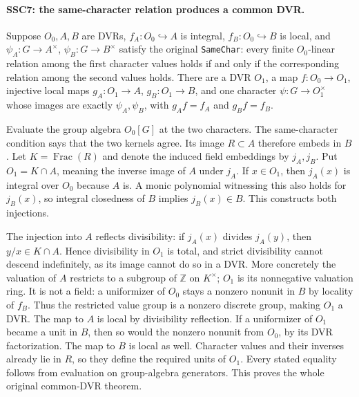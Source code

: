\documentclass[11pt,a4paper]{article}
\numberwithin{equation}{section}
\theoremstyle{remark}\newtheorem{remark}[theorem]{Remark}
\begin{document}
\paragraph{SSC7: the same-character relation produces a common DVR.}
\label{claim:SSC7}
Suppose $O_0,A,B$ are DVRs, $f_A:O_0\hookrightarrow A$ is
integral, $f_B:O_0\hookrightarrow B$ is local, and
$\psi_A:G\to A^\times$, $\psi_B:G\to B^\times$ satisfy the
original \texttt{Same\allowbreak Char}: every finite $O_0$-linear relation
among the first character values holds if and only if the
corresponding relation among the second values holds. There are a
DVR $O_1$, a map $f:O_0\to O_1$, injective local maps
$g_A:O_1\to A$, $g_B:O_1\to B$, and one character
$\psi:G\to O_1^\times$ whose images are exactly $\psi_A,\psi_B$,
with $g_Af=f_A$ and $g_Bf=f_B$.

Evaluate the group algebra $O_0[G]$ at the two characters. The
same-character condition says that the two kernels agree. Its
image $R\subset A$ therefore embeds in $B$. Let
$K=\operatorname{Frac}(R)$ and denote the induced field embeddings
by $j_A,j_B$. Put $O_1=K\cap A$, meaning the inverse image of $A$
under $j_A$. If $x\in O_1$, then $j_A(x)$ is integral over $O_0$
because $A$ is. A monic polynomial witnessing this also holds
for $j_B(x)$, so integral closedness of $B$ implies $j_B(x)\in B$.
This constructs both injections.

The injection into $A$ reflects divisibility: if $j_A(x)$ divides
$j_A(y)$, then $y/x\in K\cap A$. Hence divisibility in $O_1$
is total, and strict divisibility cannot descend indefinitely,
as its image cannot do so in a DVR. More concretely the valuation
of $A$ restricts to a subgroup of $\mathbb Z$ on $K^\times$;
$O_1$ is its nonnegative valuation ring. It is not a field:
a uniformizer of $O_0$ stays a nonzero nonunit in $B$ by locality
of $f_B$. Thus the restricted value group is a nonzero discrete
group, making $O_1$ a DVR. The map to $A$ is local by divisibility
reflection. If a uniformizer of $O_1$ became a unit in $B$, then
so would the nonzero nonunit from $O_0$, by its DVR factorization.
The map to $B$ is local as well. Character values and their inverses
already lie in $R$, so they define the required units of $O_1$.
Every stated equality follows from evaluation on group-algebra
generators. This proves the whole original common-DVR theorem.

\end{document}
